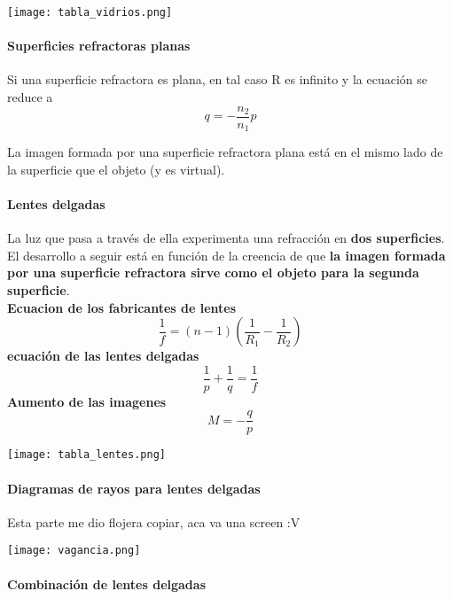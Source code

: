 \documentclass[10pt]{article}
\begin{document}
\texttt{[image: tabla\_vidrios.png]}

\paragraph{Superficies refractoras planas}

Si una superficie refractora es plana, en tal caso R es infinito y la ecuación se reduce a
\begin{equation*}
	q = - \dfrac{n_2}{n_1}p
\end{equation*}

La imagen formada por una superficie refractora plana está en el mismo lado de la superficie que el objeto (y es virtual).

\paragraph{Lentes delgadas}

La luz que pasa a través de ella experimenta una refracción en \textbf{dos superficies}. El desarrollo a seguir está en función de la creencia de que \textbf{la imagen formada por una superficie refractora sirve como el objeto para la segunda superficie}.\\
\linebreak
\textbf{Ecuacion de los fabricantes de lentes}
\begin{equation*}
	\dfrac{1}{f} = (n-1)\left( \dfrac{1}{R_1} - \dfrac{1}{R_2}  \right) 
\end{equation*}
\textbf{ ecuación de las lentes delgadas}
\begin{equation*}
	\dfrac{1}{p} + \dfrac{1}{q} = \dfrac{1}{f}
\end{equation*}
\textbf{Aumento de las imagenes}
\begin{equation*}
	M = -\dfrac{q}{p}
\end{equation*}

\texttt{[image: tabla\_lentes.png]}

\paragraph{Diagramas de rayos para lentes delgadas}
Esta parte me dio flojera copiar, aca va una screen :V

\texttt{[image: vagancia.png]}

\paragraph{Combinación de lentes delgadas}
\end{document}
